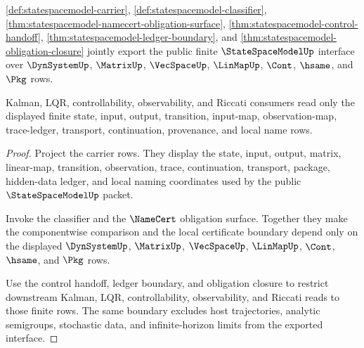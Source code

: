 \begin{theorem}
\label{thm:statespacemodel-public-finite-transition-export}
\autoref{def:statespacemodel-carrier},
\autoref{def:statespacemodel-classifier},
\autoref{thm:statespacemodel-namecert-obligation-surface},
\autoref{thm:statespacemodel-control-handoff},
\autoref{thm:statespacemodel-ledger-boundary}, and
\autoref{thm:statespacemodel-obligation-closure} jointly export the public
finite $\StateSpaceModelUp$ interface over $\DynSystemUp$, $\MatrixUp$,
$\VecSpaceUp$, $\LinMapUp$, $\Cont$, $\hsame$, and $\Pkg$ rows.

Kalman, LQR, controllability, observability, and Riccati consumers read only
the displayed finite state, input, output, transition, input-map,
observation-map, trace-ledger, transport, continuation, provenance, and local
name rows.
\end{theorem}
\begin{proof}
Project the carrier rows. They display the state, input, output, matrix,
linear-map, transition, observation, trace, continuation, transport, package,
hidden-data ledger, and local naming coordinates used by the public
$\StateSpaceModelUp$ packet.

Invoke the classifier and the $\NameCert$ obligation surface. Together they
make the componentwise comparison and the local certificate boundary depend
only on the displayed $\DynSystemUp$, $\MatrixUp$, $\VecSpaceUp$, $\LinMapUp$,
$\Cont$, $\hsame$, and $\Pkg$ rows.

Use the control handoff, ledger boundary, and obligation closure to restrict
downstream Kalman, LQR, controllability, observability, and Riccati reads to
those finite rows. The same boundary excludes host trajectories, analytic
semigroups, stochastic data, and infinite-horizon limits from the exported
interface.
\end{proof}

